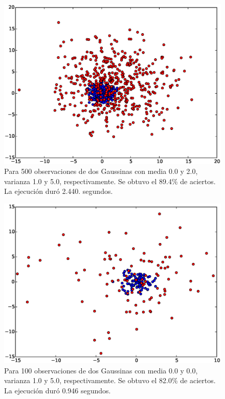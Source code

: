 \documentclass[11pt,letterpaper,reqno]{article}
\begin{document}
\begin{figure}[h]
	\centering
	\includegraphics[scale=.5]{img3}
	\caption{Para 500 observaciones de dos Gaussinas con media 0.0 y 2.0, varianza 1.0 y 5.0, respectivamente. Se obtuvo el 89.4\% de aciertos. La ejecución duró 2.440. segundos.}
\end{figure}

\begin{figure}[h]
	\centering
	\includegraphics[scale=.5]{img4}
	\caption{Para 100 observaciones de dos Gaussinas con media 0.0 y 0.0, varianza 1.0 y 5.0, respectivamente. Se obtuvo el 82.0\% de aciertos. La ejecución duró 0.946 segundos.}
\end{figure}
\end{document}
